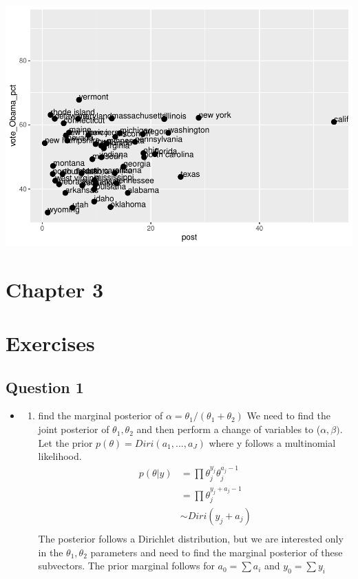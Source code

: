 \documentclass[
]{book}
\providecommand{\tightlist}{%
  \setlength{\itemsep}{0pt}\setlength{\parskip}{0pt}}
\theoremstyle{definition}
\theoremstyle{definition}
\theoremstyle{definition}
\theoremstyle{definition}
\theoremstyle{remark}
\begin{document}
\includegraphics{_main_files/figure-latex/unnamed-chunk-29-3.pdf}

\hypertarget{chapter-3}{%
\chapter{Chapter 3}\label{chapter-3}}

\hypertarget{exercises-2}{%
\chapter*{Exercises}\label{exercises-2}}

\hypertarget{question-1-1}{%
\section{Question 1}\label{question-1-1}}

\begin{itemize}
\item
  \begin{enumerate}
  \def\labelenumi{(\alph{enumi})}
  \tightlist
  \item
    find the marginal posterior of \(\alpha = \theta_1/(\theta_1+\theta_2)\)
    We need to find the joint posterior of \(\theta_1, \theta_2\) and then perform a change of variables to (\(\alpha,\beta)\). Let the prior \(p(\theta)=Diri(a_1,...,a_J)\) where y follows a multinomial likelihood.
    \[
    \begin{aligned}
    p(\theta | y) &= \prod \theta_j^{y_j}\theta_j^{a_j-1}\\
    &= \prod \theta_j^{y_j+a_j-1}\\
    & \sim Diri(y_j+a_j)\\
    \end{aligned}
    \]
    The posterior follows a Dirichlet distribution, but we are interested only in the \(\theta_1,\theta_2\) parameters and need to find the marginal posterior of these subvectors. The prior marginal follows for \(a_0= \sum a_i\) and \(y_0= \sum y_i\)
  \end{enumerate}
\end{itemize}
\end{document}
